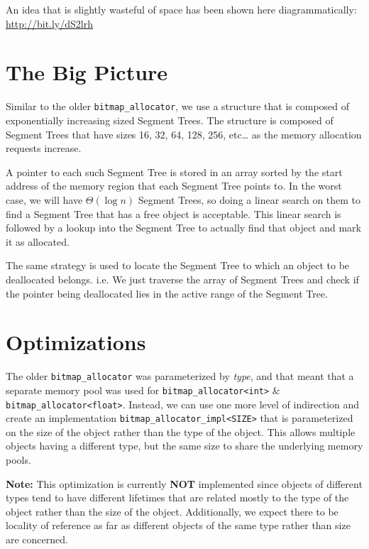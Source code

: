 \documentclass{article}
\begin{document}
An idea that is slightly wasteful of space has been shown
here diagrammatically:\\
\url{http://bit.ly/dS2lrh}

\section{The Big Picture}

Similar to the older \texttt{bitmap\_allocator}, we use a structure
that is composed of exponentially increasing sized Segment Trees. The
structure is composed of Segment Trees that have sizes 16, 32, 64,
128, 256, etc\ldots{} as the memory allocation requests increase.

A pointer to each such Segment Tree is stored in an array sorted by
the start address of the memory region that each Segment Tree points
to. In the worst case, we will have $\Theta(\log{n})$ Segment Trees,
so doing a linear search on them to find a Segment Tree that has a
free object is acceptable. This linear search is followed by a lookup
into the Segment Tree to actually find that object and mark it as
allocated.

The same strategy is used to locate the Segment Tree to which an
object to be deallocated belongs. i.e. We just traverse the array of
Segment Trees and check if the pointer being deallocated lies in the
active range of the Segment Tree.

\section{Optimizations}

The older \texttt{bitmap\_allocator} was parameterized by
\textit{type}, and that meant that a separate memory pool was used for
\texttt{bitmap\_allocator<int>} \&
\texttt{bitmap\_allocator<float>}. Instead, we can use one more level
of indirection and create an implementation
\texttt{bitmap\_allocator\_impl<SIZE>} that is parameterized on the
size of the object rather than the type of the object. This allows
multiple objects having a different type, but the same size to share
the underlying memory pools.

\textbf{Note:} This optimization is currently \textbf{NOT} implemented
since objects of different types tend to have different lifetimes that
are related mostly to the type of the object rather than the size of
the object. Additionally, we expect there to be locality of reference
as far as different objects of the same type rather than size are
concerned.
\end{document}
